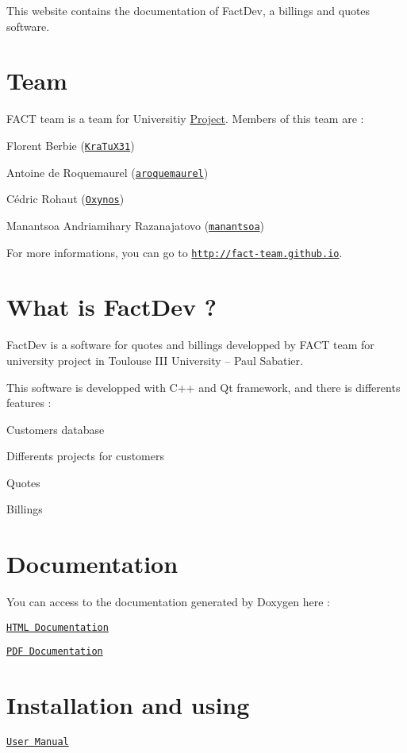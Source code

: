 This website contains the documentation of Fact\+Dev, a billings and quotes software.

\section*{Team}

F\+A\+C\+T team is a team for Universitiy \hyperlink{classProject}{Project}. Members of this team are \+:
\begin{DoxyItemize}
\item Florent Berbie (\href{https://github.com/KraTuX31 KraTuX31}{\tt Kra\+Tu\+X31})
\item Antoine de Roquemaurel (\href{https://github.com/aroquemaurel}{\tt aroquemaurel})
\item Cédric Rohaut (\href{https://github.com/Oxynos}{\tt Oxynos})
\item Manantsoa Andriamihary Razanajatovo (\href{https://github.com/manantsoa}{\tt manantsoa})
\end{DoxyItemize}

For more informations, you can go to \href{http://fact-team.github.io}{\tt http\+://fact-\/team.\+github.\+io}.

\section*{What is Fact\+Dev ?}



Fact\+Dev is a software for quotes and billings developped by F\+A\+C\+T team for university project in Toulouse I\+I\+I University – Paul Sabatier.

This software is developped with C++ and Qt framework, and there is differents features \+:
\begin{DoxyItemize}
\item Customers database
\item Differents projects for customers
\item Quotes
\item Billings
\end{DoxyItemize}

\section*{Documentation}

You can access to the documentation generated by Doxygen here \+:
\begin{DoxyItemize}
\item \href{http://fact-team.github.io/doc/html/index.html}{\tt H\+T\+M\+L Documentation}
\item \href{http://fact-team.github.io/doc/latex/refman.pdf}{\tt P\+D\+F Documentation}
\end{DoxyItemize}

\section*{Installation and using}


\begin{DoxyItemize}
\item \href{http://fact-team.github.io/doc/usermanual.pdf}{\tt User Manual} 
\end{DoxyItemize}